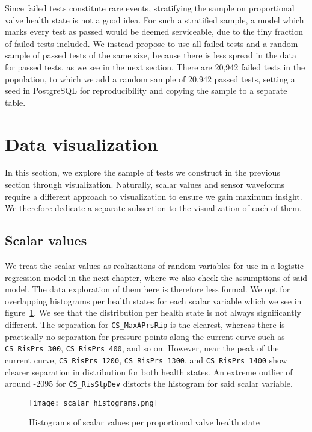 Since failed tests constitute rare events, stratifying the sample on proportional valve health state is not a good idea.
For such a stratified sample, a model which marks every test as passed would be deemed serviceable, due to the tiny fraction of failed tests included.
We instead propose to use all failed tests and a random sample of passed tests of the same size, because there is less spread in the data for passed tests, as we see in the next section.
There are 20,942 failed tests in the population, to which we add a random sample of 20,942 passed tests, setting a seed in PostgreSQL for reproducibility and copying the sample to a separate table.

\section{Data visualization}

In this section, we explore the sample of tests we construct in the previous section through visualization.
Naturally, scalar values and sensor waveforms require a different approach to visualization to ensure we gain maximum insight.
We therefore dedicate a separate subsection to the visualization of each of them.

\subsection{Scalar values}

We treat the scalar values as realizations of random variables for use in a logistic regression model in the next chapter, where we also check the assumptions of said model.
The data exploration of them here is therefore less formal.
We opt for overlapping histograms per health states for each scalar variable which we see in figure~\ref{fig:scalar-histograms}.
We see that the distribution per health state is not always significantly different.
The separation for \texttt{CS\_MaxAPrsRip} is the clearest, whereas there is practically no separation for pressure points along the current curve such as \texttt{CS\_RisPrs\_300}, \texttt{CS\_RisPrs\_400}, and so on.
However, near the peak of the current curve, \texttt{CS\_RisPrs\_1200}, \texttt{CS\_RisPrs\_1300}, and \texttt{CS\_RisPrs\_1400} show clearer separation in distribution for both health states.
An extreme outlier of around -2095 for \texttt{CS\_RisSlpDev} distorts the histogram for said scalar variable.

\begin{landscape}
\begin{figure}
  \texttt{[image: scalar\_histograms.png]}
  \caption{Histograms of scalar values per proportional valve health state}
  \label{fig:scalar-histograms}
\end{figure}
\end{landscape}

